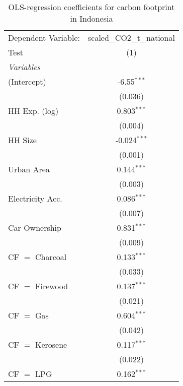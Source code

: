 
\begin{table}[htbp!]
   \centering
   \small
   \begin{adjustbox}{width = 1\textwidth, max height = 0.95\textheight, center}
      \begin{threeparttable}[b]
         \caption{\label{tab:OLS_2_IDN} OLS-regression coefficients for carbon footprint in Indonesia}
         \begin{tabular}{lc}
            \tabularnewline \midrule \midrule
            Dependent Variable: & scaled\_CO2\_t\_national\\     
            Test                & (1)\\  
            \midrule
            \emph{Variables}\\
            (Intercept)         & -6.55$^{***}$\\   
                                & (0.036)\\   
            HH Exp. (log)       & 0.803$^{***}$\\   
                                & (0.004)\\   
            HH Size             & -0.024$^{***}$\\   
                                & (0.001)\\   
            Urban Area          & 0.144$^{***}$\\   
                                & (0.003)\\   
            Electricity Acc.    & 0.086$^{***}$\\   
                                & (0.007)\\   
            Car Ownership       & 0.831$^{***}$\\   
                                & (0.009)\\   
            CF $=$ Charcoal     & 0.133$^{***}$\\   
                                & (0.033)\\   
            CF $=$ Firewood     & 0.137$^{***}$\\   
                                & (0.021)\\   
            CF $=$ Gas          & 0.604$^{***}$\\   
                                & (0.042)\\   
            CF $=$ Kerosene     & 0.117$^{***}$\\   
                                & (0.022)\\   
            CF $=$ LPG          & 0.162$^{***}$\\   

\end{tabular}
\end{threeparttable}
\end{adjustbox}
\end{table}
